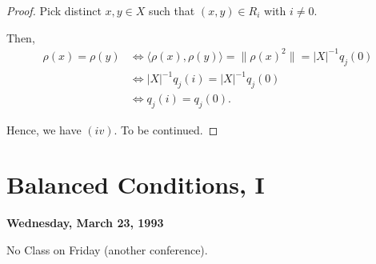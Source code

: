 \documentclass[
]{book}
\theoremstyle{definition}
\theoremstyle{definition}
\theoremstyle{definition}
\theoremstyle{definition}
\theoremstyle{remark}
\begin{document}
\begin{proof}
Pick distinct \(x,y\in X\) such that \((x,y)\in R_i\) with \(i\neq 0\).

Then,
\begin{align}
\rho(x) = \rho(y) & \Leftrightarrow \langle \rho(x),\rho(y)\rangle = \|\rho(x)^2\| = |X|^{-1}q_j(0)\\
& \Leftrightarrow |X|^{-1}q_j(i) = |X|^{-1}q_j(0)\\
& \Leftrightarrow q_j(i) = q_j(0).
\end{align}

Hence, we have \((iv)\). To be continued.

\end{proof}

\hypertarget{lec24}{%
\chapter{Balanced Conditions, I}\label{lec24}}

\textbf{Wednesday, March 23, 1993}

No Class on Friday (another conference).
\end{document}
